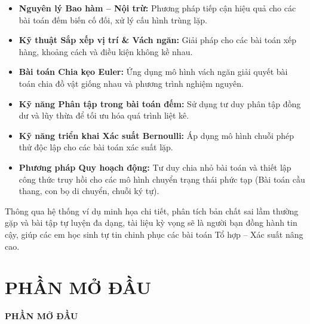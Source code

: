 \documentclass[12pt, a4paper]{article}
\begin{document}
	\begin{itemize}[leftmargin=*, label=\textcolor{maincolor}{\textbullet}]
		\item \textbf{Nguyên lý Bao hàm -- Nội trừ:} Phương pháp tiếp cận hiệu quả cho các bài toán đếm biến cố đối, xử lý cấu hình trùng lặp.
		
		\item \textbf{Kỹ thuật Sắp xếp vị trí \& Vách ngăn:} Giải pháp cho các bài toán xếp hàng, khoảng cách và điều kiện không kề nhau.
		
		\item \textbf{Bài toán Chia kẹo Euler:} Ứng dụng mô hình vách ngăn giải quyết bài toán chia đồ vật giống nhau và phương trình nghiệm nguyên.
		
		\item \textbf{Kỹ năng Phân tập trong bài toán đếm:} Sử dụng tư duy phân tập đồng dư và lũy thừa để tối ưu hóa quá trình liệt kê.
		
		\item \textbf{Kỹ năng triển khai Xác suất Bernoulli:} Áp dụng mô hình chuỗi phép thử độc lập cho các bài toán xác suất lặp.
		
		\item \textbf{Phương pháp Quy hoạch động:} Tư duy chia nhỏ bài toán và thiết lập công thức truy hồi cho các mô hình chuyển trạng thái phức tạp (Bài toán cầu thang, con bọ di chuyển, chuỗi ký tự).
	\end{itemize}
	
	\vspace{0.3cm}
	
	\indent Thông qua hệ thống ví dụ minh họa chi tiết, phân tích bản chất sai lầm thường gặp và bài tập tự luyện đa dạng, tài liệu kỳ vọng sẽ là người bạn đồng hành tin cậy, giúp các em học sinh tự tin chinh phục các bài toán Tổ hợp -- Xác suất nâng cao.
	
	\newpage
	
	\section*{PHẦN MỞ ĐẦU}
	
	\begin{tcolorbox}[colback=headerbg, colframe=maincolor, arc=3mm, boxrule=1.5pt, halign=center]
		\textbf{\LARGE PHẦN MỞ ĐẦU}
	\end{tcolorbox}
	
	\vspace{0.5cm}
	
\end{document}
